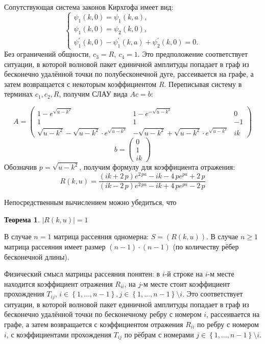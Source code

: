 \documentclass[a4 paper, 12 pt]{extarticle}
\newtheorem{theorem}{Теорема}[section]
\begin{document}
   Сопутствующая система законов Кирхгофа имеет вид:
   \[\begin{cases}
   \psi_1\left(k,0\right)=\psi_1\left(k,a\right), \\
   \psi_{1}\left(k,0\right)=\psi_2\left(k,0\right), \\
   \psi_1^\prime\left(k,0\right)-\psi_1^\prime\left(k,a\right)+\psi_2^\prime\left(k,0\right)=0.
   \end{cases}
   \]
   Без ограничений общности, $c_3=R, \ c_4 = 1$. Это предположение соответствует ситуации, в которой волновой пакет единичной амплитуды попадает в граф из бесконечно удалённой точки по полубесконечной дуге, рассеивается на графе, а затем возвращается с некоторым коэффициентом $R$. Переписывая систему в терминах $c_1,c_2,R$, получим СЛАУ вида $Ac=b$:
   
   \[ A = \left(\begin{smallmatrix}
   1-e^{\sqrt{u-k^2}} & 1-e^{-\sqrt{u-k^2}} & 0 \\
   1 & 1 & -1 \\
   \sqrt{u-k^2}-\sqrt{u-k^2} \cdot e^{\sqrt{u-k^2}} & -\sqrt{u-k^2}+\sqrt{u-k^2} \cdot e^{\sqrt{u-k^2}} & ik
   \end{smallmatrix}\right)\]
   \[b = \left(\begin{smallmatrix}
   0 \\
   1 \\
   ik
   \end{smallmatrix}\right)
   \]
   Обозначив $p=\sqrt{u-k^2}$, получим формулу для коэффициента отражения:
   \begin{equation}
   R\left(k,u\right) = {\frac { \left( ik+2\,p \right) {e}^{2\,pa}-ik-4\,p{e}^{pa}+2\,p}{ \left( ik-2\,p \right) {e}^{2\,pa}-ik+4\,p{e}^{pa}-2\,p}}
   \end{equation}
     
   Непосредственным вычислением можно убедиться, что 
   \begin{theorem}
   	$\left|R\left(k,u\right)\right| = 1$
   \end{theorem}
   
   В случае $n=1$ матрица рассеяния одномерна: $S = \left(R\left(k,u\right)\right)$. 
   В случае $n \geqslant 1$ матрица рассеяния имеет размер $(n-1) \cdot (n-1)$ (по количеству рёбер бесконечной длины).
   
   Физический смысл матрицы рассеяния понятен: в $i$-й строке на $i$-м месте находится коэффициент отражения $R_{ii}$, на $j$-м месте стоит коэффициент прохождения $T_{ij}$, $i \in \left\{1,\ldots,n-1\right\}, j \in \left\{1,\ldots,n-1\right\}\setminus i $.  Это соответствует ситуации, в которой волновой пакет единичной амплитуды попадает в граф из бесконечно удалённой точки по бесконечному ребру с номером $i$, рассеивается на графе, а затем возвращается с коэффициентом отражения $R_{ii}$ по ребру с номером $i$, с коэффициентами прохождения $T_{ij}$ по рёбрам с номерами $j \in \left\{1,\ldots,n-1\right\}\setminus i $.
   
\end{document}
